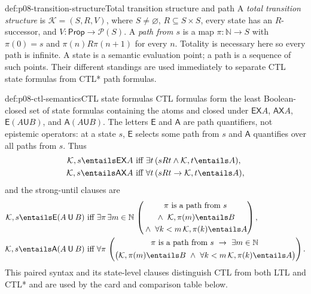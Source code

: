 \begin{hbdefinition}{def:p08-transition-structure}{Total transition structure and path}
A \emph{total transition structure} is
\(\mathcal K=(S,R,V)\), where \(S\ne\varnothing\),
\(R\subseteq S\times S\), every state has an \(R\)-successor, and
\(V:\mathsf{Prop}\to\mathcal P(S)\).  A \emph{path from \(s\)} is a map
\(\pi:\mathbb N\to S\) with \(\pi(0)=s\) and
\(\pi(n)R\pi(n+1)\) for every \(n\).  Totality is necessary here so every
path is infinite.  A state is a semantic evaluation point; a path is a
sequence of such points.  Their different standings are used immediately to
separate CTL state formulas from CTL* path formulas.
\end{hbdefinition}

\begin{hbdefinition}{def:p08-ctl-semantics}{CTL state formulas}
CTL formulas form the least Boolean-closed set of state formulas containing
the atoms and closed under
\(\mathsf{EX}A\), \(\mathsf{AX}A\),
\(\mathsf E(A\mathbin{\mathsf U}B)\), and
\(\mathsf A(A\mathbin{\mathsf U}B)\).  The letters \(\mathsf E\) and
\(\mathsf A\) are path quantifiers, not epistemic operators: at a state \(s\),
\(\mathsf E\) selects some path from \(s\) and \(\mathsf A\) quantifies over
all paths from \(s\).  Thus
\[
\begin{aligned}
 \mathcal K,s\entails\mathsf{EX}A
 &\text{ iff }
   \exists t\,(sRt\land\mathcal K,t\entails A),\\
 \mathcal K,s\entails\mathsf{AX}A
 &\text{ iff }
   \forall t\,(sRt\to\mathcal K,t\entails A),
\end{aligned}
\]
 and the strong-until clauses are
 \[
 \begin{aligned}
  \mathcal K,s\entails\mathsf E(A\mathbin{\mathsf U}B)
  &\text{ iff }
    \exists\pi\,\exists m\in\mathbb N\,
    \left(
      \begin{gathered}
        \pi\text{ is a path from }s\\
        {}\land\ \mathcal K,\pi(m)\entails B\\
        {}\land\ \forall k<m\,\mathcal K,\pi(k)\entails A
      \end{gathered}
    \right),\\
  \mathcal K,s\entails\mathsf A(A\mathbin{\mathsf U}B)
  &\text{ iff }
    \forall\pi\,
    \left(
      \begin{gathered}
        \pi\text{ is a path from }s\ \to\ \exists m\in\mathbb N\,\\
        \bigl(\mathcal K,\pi(m)\entails B\ \land\
          \forall k<m\,\mathcal K,\pi(k)\entails A\bigr)
      \end{gathered}
    \right).
 \end{aligned}
 \]
 This paired syntax and its state-level clauses distinguish CTL from both LTL
 and CTL* and are used by the card and comparison table below.
\end{hbdefinition}

